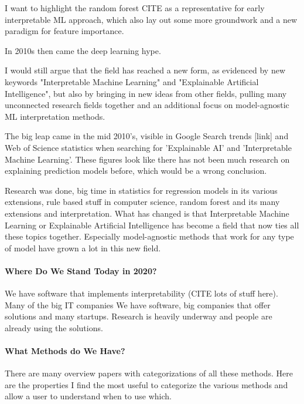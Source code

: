 \documentclass[runningheads]{llncs}
\begin{document}
I want to highlight the random forest CITE as a representative for early interpretable ML approach, which also lay out some more groundwork and a new paradigm for feature importance.

In 2010s then came the deep learning hype.

I would still argue that the field has reached a new form, as evidenced by new keywords "Interpretable Machine Learning" and "Explainable Artificial Intelligence", but also by bringing in new ideas from other fields, pulling many unconnected research fields together and an additional focus on model-agnostic ML interpretation methods.

The big leap came in the mid 2010's, visible in Google Search trends [link] and Web of Science statistics when searching for 'Explainable AI' and 'Interpretable Machine Learning'.
These figures look like there has not been much research on explaining prediction models before, which would be a wrong conclusion.

Research was done, big time in statistics for regression models in its various extensions, rule based stuff in computer science, random forest and its many extensions and interpretation.
What has changed is that Interpretable Machine Learning or Explainable Artificial Intelligence has become a field that now ties all these topics together.
Especially model-agnostic methods that work for any type of model have grown a lot in this new field.

\paragraph{Where Do We Stand Today in 2020?}

We have software that implements interpretability (CITE lots of stuff here).
Many of the big IT companies
We have software, big companies that offer solutions and many startups.
Research is heavily underway and people are already using the solutions.

\paragraph{What Methods do We Have?}

There are many overview papers with categorizations of all these methods.
Here are the properties I find the most useful to categorize the various methods and allow a user to understand when to use which.
\end{document}
